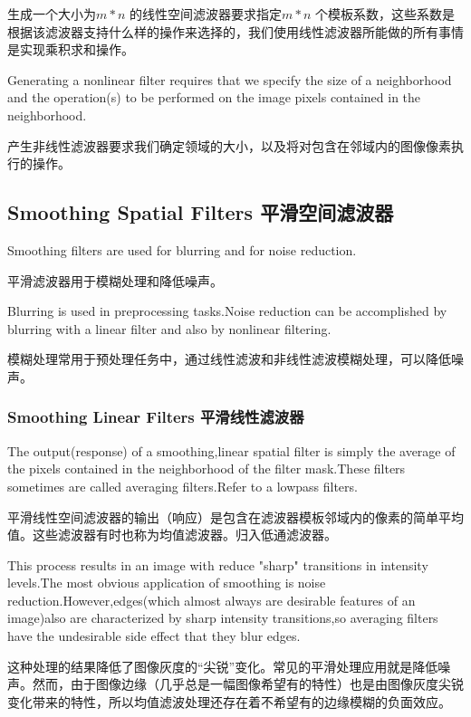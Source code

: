 \documentclass[a4paper,12pt]{article}
\numberwithin{equation}{section}%
\begin{document}
生成一个大小为$m*n$ 的线性空间滤波器要求指定$m*n$ 个模板系数，这些系数是根据该滤波器支持什么样的操作来选择的，我们使用线性滤波器所能做的所有事情是实现乘积求和操作。

Generating a nonlinear filter requires that we specify the size of a neighborhood and the operation(s) to be performed on the image pixels contained in the neighborhood.

产生非线性滤波器要求我们确定领域的大小，以及将对包含在邻域内的图像像素执行的操作。

\subsection{Smoothing Spatial Filters 平滑空间滤波器}

Smoothing filters are used for blurring and for noise reduction. 

平滑滤波器用于模糊处理和降低噪声。

Blurring is used in preprocessing tasks.Noise reduction can be accomplished by blurring with a linear filter and also by nonlinear filtering.

模糊处理常用于预处理任务中，通过线性滤波和非线性滤波模糊处理，可以降低噪声。

\subsubsection{Smoothing Linear Filters 平滑线性滤波器}

The output(response) of a smoothing,linear spatial filter is simply the average of the pixels contained in the neighborhood of the filter mask.These filters sometimes are called averaging filters.Refer to a lowpass filters.

平滑线性空间滤波器的输出（响应）是包含在滤波器模板邻域内的像素的简单平均值。这些滤波器有时也称为均值滤波器。归入低通滤波器。

This process results in an image with reduce "sharp" transitions in intensity levels.The most obvious application of smoothing is noise reduction.However,edges(which almost always are desirable features of an image)also are characterized by sharp intensity transitions,so averaging filters have the undesirable side effect that they blur edges.

这种处理的结果降低了图像灰度的“尖锐”变化。常见的平滑处理应用就是降低噪声。然而，由于图像边缘（几乎总是一幅图像希望有的特性）也是由图像灰度尖锐变化带来的特性，所以均值滤波处理还存在着不希望有的边缘模糊的负面效应。
\end{document}
